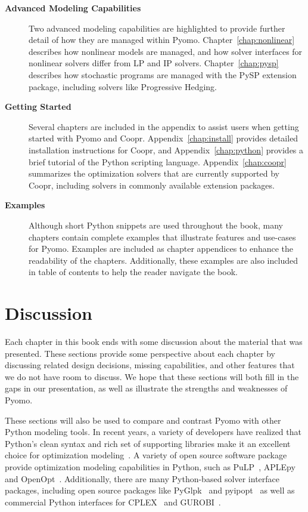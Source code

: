 \begin{description}
\item[{\bf Advanced Modeling Capabilities}] Two advanced modeling
capabilities are highlighted to provide further detail of how they
are managed within Pyomo.  Chapter~\ref{chap:nonlinear} describes how
nonlinear models are managed, and how solver interfaces for nonlinear
solvers differ from LP and IP solvers.  Chapter~\ref{chap:pysp} describes
how stochastic programs are managed with the PySP extension package,
including solvers like Progressive Hedging.

\item[{\bf Getting Started}] Several chapters are included in
the appendix to assist users when getting started with Pyomo and
Coopr. Appendix~\ref{chap:install} provides detailed installation
instructions for Coopr, and Appendix~\ref{chap:python} provides a brief
tutorial of the Python scripting language.  Appendix~\ref{chap:coopr}
summarizes the optimization solvers that are currently supported by Coopr,
including solvers in commonly available extension packages.

\item[{\bf Examples}] Although short Python snippets are used
throughout the book, many chapters contain complete examples that
illustrate features and use-cases for Pyomo.  Examples are included
as chapter appendices to enhance the readability of the chapters.
Additionally, these examples are also included in table of contents to
help the reader navigate the book.

\end{description}

\section{Discussion}
\label{chap:intro:discussion}

Each chapter in this book ends with some discussion about the material
that was presented.  These sections provide some perspective about each
chapter by discussing related design decisions, missing capabilities,
and other features that we do not have room to discuss.  We hope that these
sections will both fill in the gaps in our presentation, as well as
illustrate the strengths and weaknesses of Pyomo.

These sections will also be used to compare and contrast Pyomo with
other Python modeling tools.  In recent years, a variety of developers
have realized that Python's clean syntax and rich set of supporting
libraries make it an excellent choice for optimization modeling~\cite{hartetal11}.
A variety of open source software package provide optimization modeling
capabilities in Python, such as PuLP~\cite{PuLP}, APLEpy~\cite{APLEpy}
and OpenOpt~\cite{OpenOpt}.  Additionally, there are many Python-based
solver interface packages, including open source packages like
PyGlpk~\cite{PyGlpk} and pyipopt~\cite{pyipopt} as well as commercial
Python interfaces for CPLEX~\cite{CPLEX} and GUROBI~\cite{GUROBI}.

